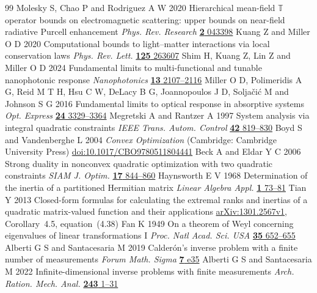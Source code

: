 \begin{thebibliography}{99}
 Molesky S, Chao P and Rodriguez A W 2020 Hierarchical mean-field $\mathbb{T}$ operator bounds on electromagnetic scattering: upper bounds on near-field radiative Purcell enhancement \emph{Phys. Rev. Research} \href{https://doi.org/10.1103/PhysRevResearch.2.043398}{\textbf{2} 043398}
 Kuang Z and Miller O D 2020 Computational bounds to light--matter interactions via local conservation laws \emph{Phys. Rev. Lett.} \href{https://doi.org/10.1103/PhysRevLett.125.263607}{\textbf{125} 263607}
 Shim H, Kuang Z, Lin Z and Miller O D 2024 Fundamental limits to multi-functional and tunable nanophotonic response \emph{Nanophotonics} \href{https://doi.org/10.1515/nanoph-2023-0630}{\textbf{13} 2107--2116}
 Miller O D, Polimeridis A G, Reid M T H, Hsu C W, DeLacy B G, Joannopoulos J D, Solja\v{c}i\'{c} M and Johnson S G 2016 Fundamental limits to optical response in absorptive systems \emph{Opt. Express} \href{https://doi.org/10.1364/OE.24.003329}{\textbf{24} 3329--3364}
 Megretski A and Rantzer A 1997 System analysis via integral quadratic constraints \emph{IEEE Trans. Autom. Control} \href{https://doi.org/10.1109/9.587335}{\textbf{42} 819--830}
 Boyd S and Vandenberghe L 2004 \emph{Convex Optimization} (Cambridge: Cambridge University Press) \href{https://doi.org/10.1017/CBO9780511804441}{doi:10.1017/CBO9780511804441}
 Beck A and Eldar Y C 2006 Strong duality in nonconvex quadratic optimization with two quadratic constraints \emph{SIAM J. Optim.} \href{https://doi.org/10.1137/050644471}{\textbf{17} 844--860}
 Haynsworth E V 1968 Determination of the inertia of a partitioned Hermitian matrix \emph{Linear Algebra Appl.} \href{https://doi.org/10.1016/0024-3795(68)90050-5}{\textbf{1} 73--81}
 Tian Y 2013 Closed-form formulas for calculating the extremal ranks and inertias of a quadratic matrix-valued function and their applications \href{https://arxiv.org/abs/1301.2567v1}{arXiv:1301.2567v1}, Corollary~4.5, equation~(4.38)
 Fan K 1949 On a theorem of Weyl concerning eigenvalues of linear transformations I \emph{Proc. Natl Acad. Sci. USA} \href{https://doi.org/10.1073/pnas.35.11.652}{\textbf{35} 652--655}
Alberti G S and Santacesaria M 2019 Calder\'on's inverse problem with a finite number of measurements \emph{Forum Math. Sigma} \href{https://doi.org/10.1017/fms.2019.31}{\textbf{7} e35}
Alberti G S and Santacesaria M 2022 Infinite-dimensional inverse problems with finite measurements \emph{Arch. Ration. Mech. Anal.} \href{https://doi.org/10.1007/s00205-021-01718-4}{\textbf{243} 1--31}

\end{thebibliography}
